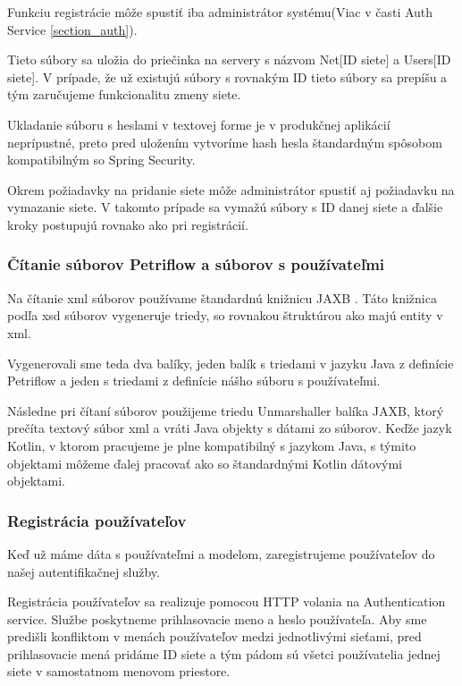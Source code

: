 Funkciu registrácie môže spustiť iba administrátor systému(Viac v časti Auth Service \ref{section_auth}).

Tieto súbory sa uložia do priečinka na servery s názvom Net[ID siete] a Users[ID siete]. V prípade, že už existujú súbory s rovnakým ID tieto súbory sa prepíšu a tým zaručujeme funkcionalitu zmeny siete.

Ukladanie súboru s heslami v textovej forme je v produkčnej aplikácií neprípustné, preto pred uložením vytvoríme hash hesla štandardným spôsobom kompatibilným so Spring Security.

Okrem požiadavky na pridanie siete môže administrátor spustiť aj požiadavku na vymazanie siete. V takomto prípade sa vymažú súbory s ID danej siete a ďalšie kroky postupujú rovnako ako pri registrácií.

\subsubsection{Čítanie súborov Petriflow a súborov s používateľmi}
Na čítanie \acrshort{xml} súborov používame štandardnú knižnicu JAXB \cite{jaxb}. Táto knižnica podľa \acrshort{xsd} súborov vygeneruje triedy, so rovnakou štruktúrou ako majú entity v \acrshort{xml}.

Vygenerovali sme teda dva balíky, jeden balík s triedami v jazyku Java z definície Petriflow a jeden s triedami z definície nášho súboru s používateľmi.

Následne pri čítaní súborov použijeme triedu Unmarshaller balíka JAXB, ktorý prečíta textový súbor \acrshort{xml} a vráti Java objekty s dátami zo súborov. Keďže jazyk Kotlin, v ktorom pracujeme je plne kompatibilný s jazykom Java, s týmito objektami môžeme ďalej pracovať ako so štandardnými Kotlin dátovými objektami.

\subsubsection{Registrácia používateľov}
Keď už máme dáta s používateľmi a modelom, zaregistrujeme používateľov do našej autentifikačnej služby.

Registrácia používateľov sa realizuje pomocou HTTP volania na Authentication service. Službe poskytneme prihlasovacie meno a heslo používateľa. Aby sme predišli konfliktom v menách používateľov medzi jednotlivými sieťami, pred prihlasovacie mená pridáme ID siete a tým pádom sú všetci používatelia jednej siete v samostatnom menovom priestore.


